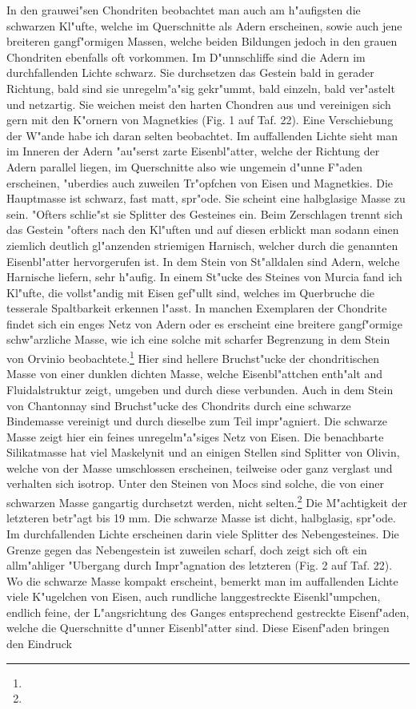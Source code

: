 \documentclass[a4paper, 11pt, oneside, polutonikogreek, german]{article}
\begin{document}
In den grauwei"sen Chondriten beobachtet man auch am h"aufigsten die schwarzen Kl"ufte, welche im Querschnitte als Adern erscheinen, sowie auch jene breiteren gangf"ormigen Massen, welche beiden Bildungen jedoch in den grauen Chondriten ebenfalls oft vorkommen. Im D"unnschliffe sind die Adern im durchfallenden Lichte schwarz. Sie durchsetzen das Gestein bald in gerader Richtung, bald sind sie unregelm"a"sig gekr"ummt, bald einzeln, bald ver"astelt und netzartig. Sie weichen meist den harten Chondren aus und vereinigen sich gern mit den K"ornern von Magnetkies (Fig. 1 auf Taf. 22). Eine Verschiebung der W"ande habe ich daran selten beobachtet. Im auffallenden Lichte sieht man im Inneren der Adern "au"serst zarte Eisenbl"atter, welche der Richtung der Adern parallel liegen, im Querschnitte also wie ungemein d"unne F"aden erscheinen, "uberdies auch zuweilen Tr"opfchen von Eisen und Magnetkies. Die Hauptmasse ist schwarz, fast matt, spr"ode. Sie scheint eine halbglasige Masse zu sein. "Ofters schlie"st sie Splitter des Gesteines ein. Beim Zerschlagen trennt sich das Gestein "ofters nach den Kl"uften und auf diesen erblickt man sodann einen ziemlich deutlich gl"anzenden striemigen Harnisch, welcher durch die genannten Eisenbl"atter hervorgerufen ist. In dem Stein von St"alldalen sind Adern, welche Harnische liefern, sehr h"aufig. In einem St"ucke des Steines von Murcia fand ich Kl"ufte, die vollst"andig mit Eisen gef"ullt sind, welches im Querbruche die tesserale Spaltbarkeit erkennen l"asst. In manchen Exemplaren der Chondrite findet sich ein enges Netz von Adern oder es erscheint eine breitere gangf"ormige schw"arzliche Masse, wie ich eine solche mit scharfer Begrenzung in dem Stein von Orvinio beobachtete.\footnote{} Hier sind hellere Bruchst"ucke der chondritischen Masse von einer dunklen dichten Masse, welche Eisenbl"attchen enth"alt and Fluidalstruktur zeigt, umgeben und durch diese verbunden. Auch in dem Stein von Chantonnay sind Bruchst"ucke des Chondrits durch eine schwarze Bindemasse vereinigt und durch dieselbe zum Teil impr"agniert. Die schwarze Masse zeigt hier ein feines unregelm"a"siges Netz von Eisen. Die benachbarte Silikatmasse hat viel Maskelynit und an einigen Stellen sind Splitter von Olivin, welche von der Masse umschlossen erscheinen, teilweise oder ganz verglast und verhalten sich isotrop. Unter den Steinen von Mocs sind solche, die von einer schwarzen Masse gangartig durchsetzt werden, nicht selten.\footnote{} Die M"achtigkeit der letzteren betr"agt bis 19 mm. Die schwarze Masse ist dicht, halbglasig, spr"ode. Im durchfallenden Lichte erscheinen darin viele Splitter des Nebengesteines. Die Grenze gegen das Nebengestein ist zuweilen scharf, doch zeigt sich oft ein allm"ahliger "Ubergang durch Impr"agnation des letzteren (Fig. 2 auf Taf. 22). Wo die schwarze Masse kompakt erscheint, bemerkt man im auffallenden Lichte viele K"ugelchen von Eisen, auch rundliche langgestreckte Eisenkl"umpchen, endlich feine, der L"angsrichtung des Ganges entsprechend gestreckte Eisenf"aden, welche die Querschnitte d"unner Eisenbl"atter sind. Diese Eisenf"aden bringen den Eindruck 
\end{document}
